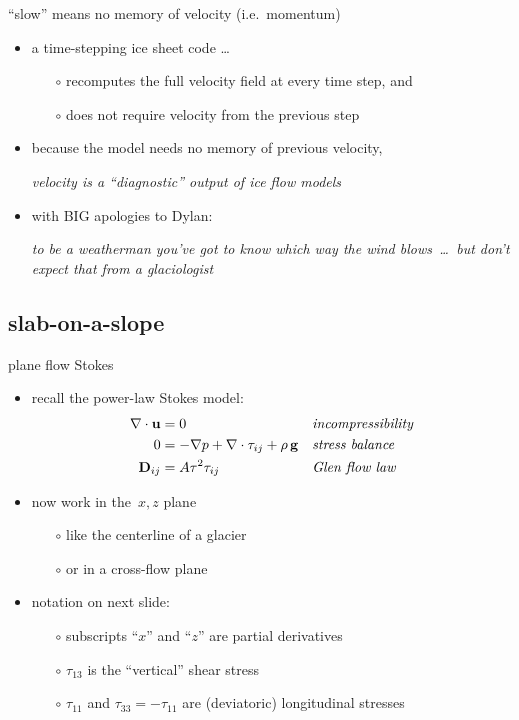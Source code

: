 \begin{frame}{``slow'' means no memory of velocity (i.e.~momentum)}

\begin{itemize}
\item a time-stepping ice sheet code \dots
  \begin{itemize}
  \item[$\circ$] recomputes the full velocity field at every time step, and
  \item[$\circ$] does not require velocity from the previous step
  \end{itemize}

\medskip
\item because the model needs no memory of previous velocity,

\smallskip
\emph{velocity is a ``diagnostic'' output of ice flow models}

\bigskip
\item with BIG apologies to Dylan:

\smallskip
\emph{to be a weatherman you've got to know which way the wind blows \,\dots\, but don't
expect that from a glaciologist}
\end{itemize}
\end{frame}


\subsection{slab-on-a-slope}

\begin{frame}{plane flow Stokes}

\begin{itemize}
\item recall the power-law Stokes model:
\begin{align*}
\nabla \cdot \mathbf{u} &= 0 &&\text{\emph{incompressibility}} \\
0 &= - \nabla p + \nabla \cdot \tau_{ij} + \rho\, \mathbf{g} &&\text{\emph{stress balance}} \\
\mathbf{D}_{ij} &= A \tau^2 \tau_{ij} &&\text{\emph{Glen flow law}}
\end{align*}

\bigskip
\item now work in the\, $x,z$ plane
  \begin{itemize}
  \item[$\circ$] like the centerline of a glacier
  \item[$\circ$] or in a cross-flow plane
  \end{itemize}

\item notation on next slide:
  \begin{itemize}
  \item[$\circ$] subscripts ``$x$'' and ``$z$'' are partial derivatives
  \item[$\circ$] $\tau_{13}$ is the ``vertical'' shear stress
  \item[$\circ$] $\tau_{11}$ and $\tau_{33}=-\tau_{11}$ are (deviatoric) longitudinal stresses 
  \end{itemize}
\end{itemize}
\end{frame}

